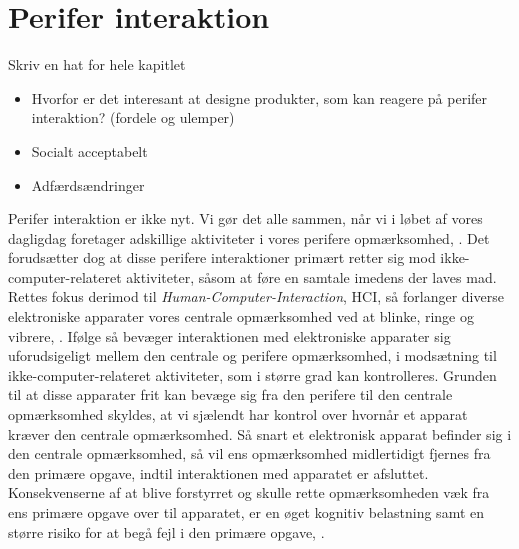 \chapter{Perifer interaktion}
\label{PeriferInteratkion}
%
Skriv en hat for hele kapitlet
%
\begin{itemize}
  \item Hvorfor er det interesant at designe produkter, som kan reagere på perifer interaktion? (fordele og ulemper) 
  \item Socialt acceptabelt 
  \item Adfærdsændringer
\end{itemize}
\noindent
%
Perifer interaktion er ikke nyt. Vi gør det alle sammen, når vi i løbet af vores dagligdag foretager adskillige aktiviteter i vores perifere opmærksomhed, \parencite[s. 1]{PDF:PeripheralInteraction}. Det forudsætter dog at disse perifere interaktioner primært retter sig mod ikke-computer-relateret aktiviteter, såsom at føre en samtale imedens der laves mad. Rettes fokus derimod til \textit{Human-Computer-Interaction}, HCI, så forlanger diverse elektroniske apparater vores centrale opmærksomhed ved at blinke, ringe og vibrere, \parencite[s. 1]{PDF:PeripheralInteraction}. Ifølge \textcite[s. 3]{PDF:PeripheralInteraction} så bevæger interaktionen med elektroniske apparater sig uforudsigeligt mellem den centrale og perifere opmærksomhed, i modsætning til ikke-computer-relateret aktiviteter, som i større grad kan kontrolleres. Grunden til at disse apparater frit kan bevæge sig fra den perifere til den centrale opmærksomhed skyldes, at vi sjælendt har kontrol over hvornår et apparat kræver den centrale opmærksomhed. Så snart et elektronisk apparat befinder sig i den centrale opmærksomhed, så vil ens opmærksomhed midlertidigt fjernes fra den primære opgave, indtil interaktionen med apparatet er afsluttet. Konsekvenserne af at blive forstyrret og skulle rette opmærksomheden væk fra ens primære opgave over til apparatet, er en øget kognitiv belastning samt en større risiko for at begå fejl i den primære opgave, \parencite[ss. 188-189][s. 162]{PDF:PeripheralInteraction, PDF:ComparingInputModalities}. 

